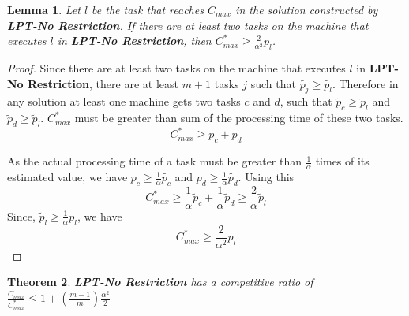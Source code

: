 \documentclass[10pt, conference, compsocconf]{IEEEtran}
\newtheorem{theorem}{Theorem}
\newtheorem{lemma}[theorem]{Lemma}
\begin{document}
\begin{lemma}\label{No Restriction}
  Let $l$ be the task that reaches $C_{max}$ in the solution
  constructed by \textbf{LPT-No Restriction}. If there are at least two
  tasks on the machine that executes $l$ in \textbf{LPT-No Restriction}, then 
  $C_{max}^* \geq {\frac{2}{\alpha^{2}}} p_l$.
\end{lemma}
\begin{proof}
  Since there are at least two tasks on the machine that executes $l$
  in \textbf{LPT-No Restriction}, there are at least $m+1$ tasks $j$
  such that $\tilde{p_j} \geq \tilde{p_l}$. Therefore in any solution
  at least one machine gets two tasks $c$ and $d$, such that $\tilde
  p_c \geq \tilde p_l$ and $\tilde p_d \geq \tilde p_l$. $C_{max}^{*}$
  must be greater than sum of the processing time of these two tasks.
   \begin{equation}\nonumber
    C_{max}^{*}\geq p_c + p_d
  \end{equation}	

  As the actual processing time of a task must be greater than
  $\frac{1}{\alpha}$ times of its estimated value, we have $p_c \geq
  \frac{1}{\alpha}\tilde{p_c}$ and $p_d \geq
  \frac{1}{\alpha}\tilde{p_d}$. Using this
  \begin{equation}\nonumber 
    C_{max}^{*} \geq \frac{1}{\alpha}\tilde p_c +  \frac{1}{\alpha} \tilde p_d \geq \frac{2}{\alpha}\tilde p_l
  \end{equation}
Since, $\tilde p_l \geq \frac{1}{\alpha} p_l$, we have
  \begin{equation}\nonumber
    C_{max}^{*} \geq {\frac{2}{\alpha^{2}}} p_l 
  \end{equation}
\end{proof}

\begin{theorem}
  \label{th:strategy2}
  \textbf{LPT-No Restriction} has a competitive ratio of
  $\frac{C_{max}}{C_{max}^{*}} \leq 1 + (\frac{m-1}{m})
  \frac{\alpha^{2}}{2}$
\end{theorem} 
\end{document}
